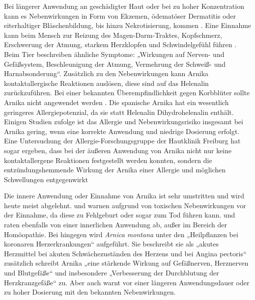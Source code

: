 Bei längerer Anwendung an geschädigter Haut oder bei zu hoher Konzentration kann es Nebenwirkungen in Form von Ekzemen, ödematöser Dermatitis oder eiterhaltiger Bläschenbildung, bis hinzu Nekrotisierung, kommen \citep[vgl.][S. 144 f.]{Roth2012}. Eine Einnahme kann beim Mensch zur Reizung des Magen-Darm-Traktes, Kopfschmerz, Erschwerung der Atmung, starkem Herzklopfen und Schwindelgefühl führen \citep[vgl.][S. 144 f., S.178]{Roth2012, Schoenfelder2015}. Beim Tier beschreiben \citet{Roth2012} ähnliche Symptome: „Wirkungen auf Nerven- und Gefäßsystem, Beschleunigung der Atmung, Vermehrung der Schweiß- und Harnabsonderung“. Zusätzlich zu den Nebenwirkungen kann Arnika kontaktallergische Reaktionen auslösen, diese sind auf das Helenalin zurückzuführen. Bei einer bekannten Überempfindlichkeit gegen Korbblüter sollte Arnika nicht angewendet werden \citep[vgl.]{Schoenfelder2015, FNR2013, Wyk2015}. 
Die spanische Arnika hat ein wesentlich geringeres Allergiepotenzial, da sie statt Helenalin Dihydrohelenalin enthält. Einigen Studien zufolge ist das Allergie und Nebenwirkungsrisiko insgesamt bei Arnika gering, wenn eine korrekte Anwendung und niedrige Dosierung erfolgt. Eine Untersuchung der Allergie-Forschungsgruppe der Hautklinik Freiburg hat sogar ergeben, dass bei der äußeren Anwendung von Arnika nicht nur keine kontaktallergene Reaktionen festgestellt werden konnten, sondern die entzündungshemmende Wirkung der Arnika einer Allergie und möglichen Schwellungen entgegenwirkt \citep[vgl.][S. 448]{Buehring2014}

Die innere Anwendung oder Einnahme von Arnika ist sehr umstritten und wird heute meist abgelehnt. \citet[S. 144 f.]{Roth2012} und \citet[S. 62]{Wyk2015} warnen aufgrund von toxischen Nebenwirkungen vor der Einnahme, da diese zu Fehlgeburt oder sogar zum Tod führen kann. \citet[S. 73 f.]{Schoenfelder2011} und \citet[S. 32. f]{FNR2013} raten ebenfalls von einer innerlichen Anwendung ab, außer im Bereich der Homöopathie. Bei \citet[S. 40 f.]{Prentner2017} hingegen wird \textit{Arnica montana} unter den „Heilpflanzen bei koronaren Herzerkrankungen“ aufgeführt. Sie beschreibt sie als „akutes Herzmittel bei akuten Schwächezuständen des Herzens und bei Angina pectoris“ zusätzlich schreibt \citet[S. 40 f]{Prentner2017} Arnika „eine stärkende Wirkung auf Gefäßnerven, Herznerven und Blutgefäße“ und insbesondere „Verbesserung der Durchblutung der Herzkranzgefäße“ zu. Aber auch \citet[S. 40 f.]{Prentner2017} warnt vor einer längeren Anwendungsdauer oder zu hoher Dosierung mit den bekannten Nebenwirkungen.

